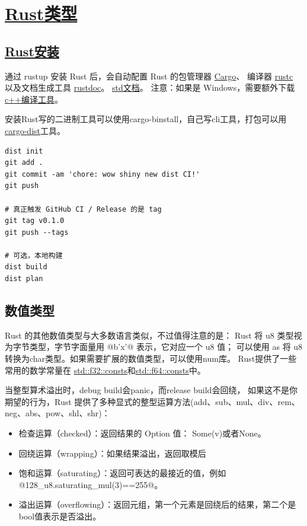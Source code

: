 \section{\href{https://doc.rust-lang.org/reference/types.html}{Rust类型}}
\subsection{\href{https://rustup.rs}{Rust安装}}
通过 rustup 安装 Rust 后，会自动配置 Rust 的包管理器 \href{https://doc.rust-lang.org/cargo/}{Cargo}、
编译器 \href{https://doc.rust-lang.org/rustc/}{rustc} 以及文档生成工具 \href{https://doc.rust-lang.org/rustdoc/}{rustdoc}。
\href{https://doc.rust-lang.org/std/all.html}{std文档}。
注意：如果是 Windows，需要额外下载\href{https://visualstudio.microsoft.com/zh-hans/visual-cpp-build-tools/}{c++编译工具}。

安装Rust写的二进制工具可以使用cargo-binstall，自己写cli工具，打包可以用\href{https://axodotdev.github.io/cargo-dist/}{cargo-dist}工具。

\begin{code}[title=dist使用示例]
	\begin{verbatim}
dist init
git add .
git commit -am 'chore: wow shiny new dist CI!'
git push

# 真正触发 GitHub CI / Release 的是 tag
git tag v0.1.0
git push --tags

# 可选，本地构建
dist build
dist plan
    \end{verbatim}
\end{code}

\subsection{数值类型}
Rust 的其他数值类型与大多数语言类似，不过值得注意的是：
Rust 将 u8 类型视为字节类型，字节字面量用 @b'x'@ 表示，它对应一个 u8 值；
可以使用 as 将 u8 转换为char类型。如果需要扩展的数值类型，可以使用num库。
Rust提供了一些常用的数学常量在 \href{https://doc.rust-lang.org/std/f32/consts/}{std::f32::consts}和\href{https://doc.rust-lang.org/std/f64/consts/}{std::f64::consts}中。

当整型算术溢出时，debug build会panic，而release build会回绕，
如果这不是你期望的行为，Rust 提供了多种显式的整型运算方法(add、sub、mul、div、rem、neg、abs、pow、shl、shr)：
\begin{itemize}[itemsep=0pt, parsep=0pt]
	\item 检查运算（checked）：返回结果的 Option 值： Some(v)或者None。
	\item 回绕运算（wrapping）：如果结果溢出，返回取模后
	\item 饱和运算（saturating）：返回可表达的最接近的值，例如@128_u8.saturating_mul(3)==255@。
	\item 溢出运算（overflowing）：返回元组，第一个元素是回绕后的结果，第二个是bool值表示是否溢出。
\end{itemize}

